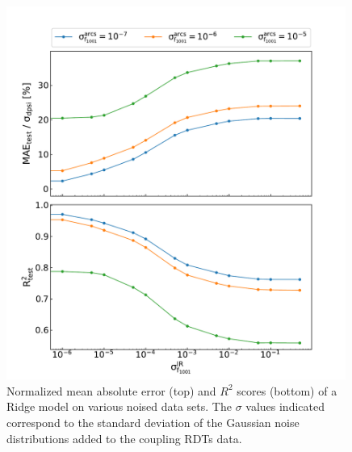 \begin{figure}[!htb]
    \centering
    \includegraphics*[width=0.99\textwidth]{Figures/ML_for_IR_Coupling/ml_ridge_performance.pdf}
    \caption{Normalized mean absolute error (top) and \(R^2\) scores (bottom) of a Ridge model on various noised data sets. The \(\sigma\) values indicated correspond to the standard deviation of the Gaussian noise distributions added to the coupling RDTs data.}
    \label{figure:ridge_performance}
\end{figure}




